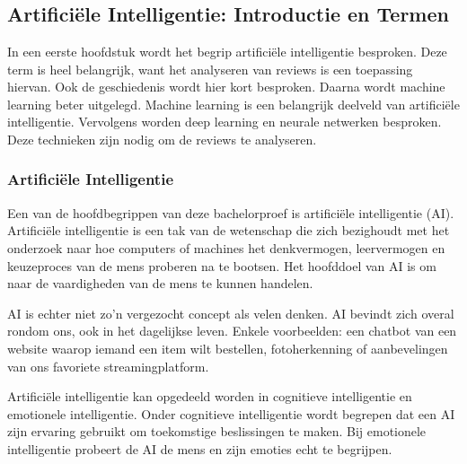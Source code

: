 \chapter{}
\label{ch:stand-van-zaken}




\section{Artificiële Intelligentie: Introductie en Termen}
\label{sec:artificiëleintelligentieintroductie}
In een eerste hoofdstuk wordt het begrip artificiële intelligentie besproken. Deze term is heel belangrijk, want het analyseren van reviews is een toepassing hiervan. Ook de geschiedenis wordt hier kort besproken. Daarna wordt machine learning beter uitgelegd. Machine learning is een belangrijk deelveld van artificiële intelligentie. Vervolgens worden deep learning en neurale netwerken besproken. Deze technieken zijn nodig om de reviews te analyseren. 

\subsection{Artificiële Intelligentie}
\label{sec:artificiëleintelligentie}
Een van de hoofdbegrippen van deze bachelorproef is artificiële intelligentie (AI). Artificiële intelligentie is een tak van de wetenschap die zich bezighoudt met het onderzoek naar hoe computers of machines het denkvermogen, leervermogen en keuzeproces van de mens proberen na te bootsen. Het hoofddoel van AI is om naar de vaardigheden van de mens te kunnen handelen. \autocite{IBM2021}

AI is echter niet zo’n vergezocht concept als velen denken. AI bevindt zich overal rondom ons, ook in het dagelijkse leven. Enkele voorbeelden: een chatbot van een website waarop iemand een item wilt bestellen, fotoherkenning of aanbevelingen van ons favoriete streamingplatform. \autocite{IBM2021}

Artificiële intelligentie kan opgedeeld worden in cognitieve intelligentie en emotionele intelligentie. Onder cognitieve intelligentie wordt begrepen dat een AI zijn ervaring gebruikt om toekomstige beslissingen te maken. Bij emotionele intelligentie probeert de AI de mens en zijn emoties echt te begrijpen. \autocite{Andreas2018}

